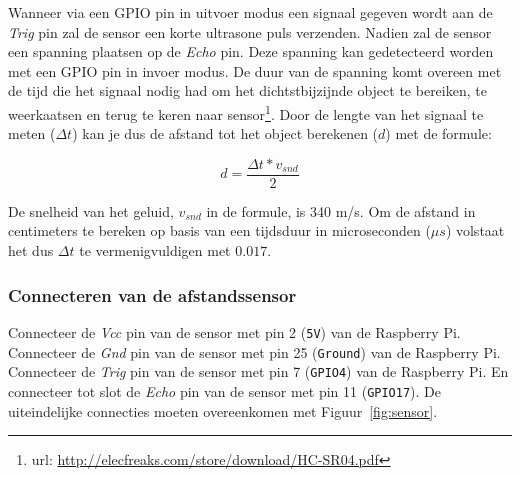 \documentclass[a4paper]{article}
\begin{document}
      Wanneer via een GPIO pin in uitvoer modus een signaal gegeven
wordt aan de \emph{Trig} pin zal de sensor een korte ultrasone puls
verzenden.  Nadien zal de sensor een spanning plaatsen op de
\emph{Echo} pin.  Deze spanning kan gedetecteerd worden met een GPIO
pin in invoer modus.  De duur van de spanning komt overeen met de tijd
die het signaal nodig had om het dichtstbijzijnde object te bereiken,
te weerkaatsen en terug te keren naar
sensor\footnote{url: \url{http://elecfreaks.com/store/download/HC-SR04.pdf}}.
Door de lengte van het signaal te meten ($\Delta t$) kan je dus de afstand tot het
object berekenen ($d$) met de formule:

    \begin{equation}
      d = \frac{\Delta t * v_{snd}}{2}
    \end{equation}

      De snelheid van het geluid, $v_{snd}$ in de formule, is 340 m/s.
Om de afstand in centimeters te bereken op basis van een tijdsduur in
microseconden ($\mu s$) volstaat het dus $\Delta t$ te
vermenigvuldigen met $0.017$.

    \subsubsection{Connecteren van de afstandssensor}

      Connecteer de \emph{Vcc} pin van de sensor met pin 2
(\texttt{5V}) van de
Raspberry Pi.  Connecteer de \emph{Gnd} pin van de sensor met pin 25
(\texttt{Ground}) van de Raspberry Pi.  Connecteer de \emph{Trig} pin van de
sensor met pin 7 (\texttt{GPIO4}) van de Raspberry Pi.  En connecteer tot
slot de \emph{Echo} pin van de sensor met pin 11 (\texttt{GPIO17}).
De uiteindelijke connecties moeten overeenkomen met
Figuur~\ref{fig:sensor}.
\end{document}
